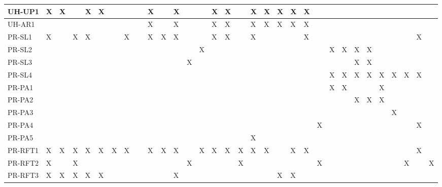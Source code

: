 \documentclass[12pt]{article}
\begin{document}
\begin{table}[!ht]
{\begin{tabular}{|l|l|l|l|l|l|l|l|l|l|l|l|l|l|l|l|l|l|l|l|l|l|l|l|l|l|l|l|l|l|l|l|}
      UH-UP1 & X & X & ~ & X & X & ~ & ~ & ~ & X & ~ & X & ~ & ~ & X & X & ~ & X & X & X & X & X & ~ & ~ & ~ & ~ & ~ & ~ & ~ & ~ & ~ & ~ \\ \hline
      UH-AR1 & ~ & ~ & ~ & ~ & ~ & ~ & ~ & ~ & X & ~ & X & ~ & ~ & X & X & ~ & X & X & X & X & X & ~ & ~ & ~ & ~ & ~ & ~ & ~ & ~ & ~ & ~ \\ \hline
      PR-SL1 & X & ~ & X & X & ~ & ~ & X & ~ & X & X & X & ~ & ~ & X & X & ~ & X & ~ & ~ & ~ & X & ~ & ~ & ~ & ~ & ~ & ~ & ~ & ~ & X & ~ \\ \hline
      PR-SL2 & ~ & ~ & ~ & ~ & ~ & ~ & ~ & ~ & ~ & ~ & ~ & ~ & X & ~ & ~ & ~ & ~ & ~ & ~ & ~ & ~ & ~ & X & X & X & X & ~ & ~ & ~ & ~ & ~ \\ \hline
      PR-SL3 & ~ & ~ & ~ & ~ & ~ & ~ & ~ & ~ & ~ & ~ & ~ & X & ~ & ~ & ~ & ~ & ~ & ~ & ~ & ~ & ~ & ~ & ~ & ~ & X & X & ~ & ~ & ~ & ~ & ~ \\ \hline
      PR-SL4 & ~ & ~ & ~ & ~ & ~ & ~ & ~ & ~ & ~ & ~ & ~ & ~ & ~ & ~ & ~ & ~ & ~ & ~ & ~ & ~ & ~ & ~ & X & X & X & X & X & X & X & X & ~ \\ \hline
      PR-PA1 & ~ & ~ & ~ & ~ & ~ & ~ & ~ & ~ & ~ & ~ & ~ & ~ & ~ & ~ & ~ & ~ & ~ & ~ & ~ & ~ & ~ & ~ & X & X & ~ & ~ & X & ~ & ~ & ~ & ~ \\ \hline
      PR-PA2 & ~ & ~ & ~ & ~ & ~ & ~ & ~ & ~ & ~ & ~ & ~ & ~ & ~ & ~ & ~ & ~ & ~ & ~ & ~ & ~ & ~ & ~ & ~ & ~ & X & X & X & ~ & ~ & ~ & ~ \\ \hline
      PR-PA3 & ~ & ~ & ~ & ~ & ~ & ~ & ~ & ~ & ~ & ~ & ~ & ~ & ~ & ~ & ~ & ~ & ~ & ~ & ~ & ~ & ~ & ~ & ~ & ~ & ~ & ~ & ~ & X & ~ & ~ & ~ \\ \hline
      PR-PA4 & ~ & ~ & ~ & ~ & ~ & ~ & ~ & ~ & ~ & ~ & ~ & ~ & ~ & ~ & ~ & ~ & ~ & ~ & ~ & ~ & ~ & X & ~ & ~ & ~ & ~ & ~ & ~ & ~ & X & ~ \\ \hline
      PR-PA5 & ~ & ~ & ~ & ~ & ~ & ~ & ~ & ~ & ~ & ~ & ~ & ~ & ~ & ~ & ~ & ~ & X & ~ & ~ & ~ & ~ & ~ & ~ & ~ & ~ & ~ & ~ & ~ & ~ & ~ & ~ \\ \hline
      PR-RFT1 & X & X & X & X & X & X & X & ~ & X & X & X & ~ & X & X & X & X & X & X & ~ & X & X & ~ & ~ & ~ & ~ & ~ & ~ & ~ & ~ & X & ~ \\ \hline
      PR-RFT2 & X & ~ & X & ~ & ~ & ~ & ~ & ~ & ~ & ~ & ~ & X & ~ & ~ & ~ & X & ~ & ~ & ~ & ~ & ~ & X & ~ & ~ & ~ & ~ & ~ & ~ & X & ~ & X \\ \hline
      PR-RFT3 & X & X & X & X & X & ~ & ~ & ~ & ~ & ~ & X & ~ & ~ & ~ & ~ & ~ & ~ & ~ & X & X & ~ & ~ & ~ & ~ & ~ & ~ & ~ & ~ & ~ & ~ & ~ \\ \hline

\end{tabular}}
\end{table}
\end{document}
